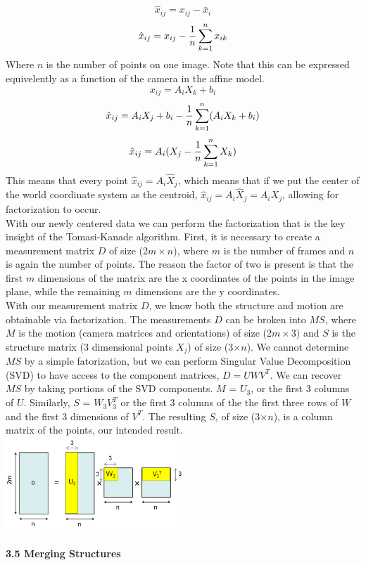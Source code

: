 \documentclass[12pt]{article}
\begin{document}
\begin{multicols}{2}
\[\hat{x}_{ij} = x_{ij} - \bar{x}_{i}\]
\[\hat{x}_{ij} = x_{ij} - {{1}\over{n}} \sum_{k=1}^{n} x_{ik}\]
Where $n$ is the number of points on one image. Note that this can be expressed equivelently as a function of the camera in the affine model. 
\[x_{ij} = A_{i}X_{k} + b_{i}\]
\[\hat{x}_{ij} = A_{i}X_{j} + b_{i} - {{1}\over{n}} \sum_{k=1}^{n} (A_{i}X_{k} + b_{i})\]
\[\hat{x}_{ij} = A_{i}(X_{j}  - {{1}\over{n}} \sum_{k=1}^{n} X_{k})\]
This means that every point $\hat{x}_{ij} = A_{i}\hat{X}_{j}$, which means that if we put the center of the world coordinate system as the centroid, $\hat{x}_{ij} = A_{i}\hat{X}_{j} = A_{i}X_{j}$, allowing for factorization to occur. \\
\indent With our newly centered data we can perform the factorization that is the key insight of the Tomasi-Kanade algorithm. First, it is necessary to create a measurement matrix $D$ of size (2$m \times n$), where $m$ is the number of frames and $n$ is again the number of points. The reason the factor of two is present is that the first $m$ dimensions of the matrix are the x coordinates of the points in the image plane, while the remaining $m$ dimensions are the y coordinates. \\
\indent	With our measurement matrix $D$, we know both the structure and motion are obtainable via factorization. The measurements $D$ can be broken into $MS$, where $M$ is the motion (camera matrices and orientations) of size (2$m \times$3) and $S$ is the structure matrix (3 dimensional points $X_{j}$) of size (3$\times n$). We cannot determine $MS$ by a simple fatorization, but we can perform Singular Value Decomposition (SVD) to have access to the component matrices, $D = UWV^T$. We can recover $MS$ by taking portions of the SVD components. $M$ = $U_{3}$, or the first 3 columns of $U$. Similarly, $S$ = $W_{3}V^{T}_{3}$ or the first 3 columns of the the first three rows of $W$ and the first 3 dimensions of $V^{T}$. The resulting $S$, of size (3$\times n$), is a column matrix of the points, our intended result. 
\includegraphics[width=0.5\textwidth]{images/SVD_of_D.png}
\\\\
{\large \textbf{3.5 Merging Structures}}\\

\end{multicols}
\end{document}
